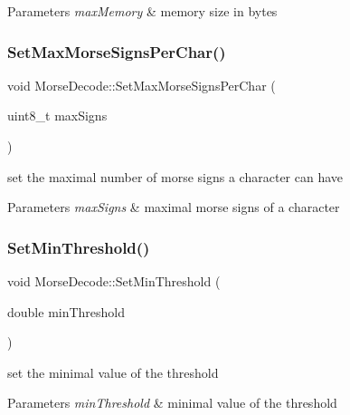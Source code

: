 \begin{DoxyParams}{Parameters}
{\em max\+Memory} & memory size in bytes \\
\hline
\end{DoxyParams}
\mbox{\label{classMorseDecode_a2b91a464dd74787aeba96e538ab167ee}} 
\subsubsection{\texorpdfstring{Set\+Max\+Morse\+Signs\+Per\+Char()}{SetMaxMorseSignsPerChar()}}
{\footnotesize\ttfamily void Morse\+Decode\+::\+Set\+Max\+Morse\+Signs\+Per\+Char (\begin{DoxyParamCaption}\item[{uint8\+\_\+t}]{max\+Signs }\end{DoxyParamCaption})}



set the maximal number of morse signs a character can have 


\begin{DoxyParams}{Parameters}
{\em max\+Signs} & maximal morse signs of a character \\
\hline
\end{DoxyParams}
\mbox{\label{classMorseDecode_a5607e1880a8a477af4e5ae5918463971}} 
\subsubsection{\texorpdfstring{Set\+Min\+Threshold()}{SetMinThreshold()}}
{\footnotesize\ttfamily void Morse\+Decode\+::\+Set\+Min\+Threshold (\begin{DoxyParamCaption}\item[{double}]{min\+Threshold }\end{DoxyParamCaption})}



set the minimal value of the threshold 


\begin{DoxyParams}{Parameters}
{\em min\+Threshold} & minimal value of the threshold \\
\hline
\end{DoxyParams}
\mbox{\label{classMorseDecode_ac3d5e669b19c651d522b7f271da53640}} 
